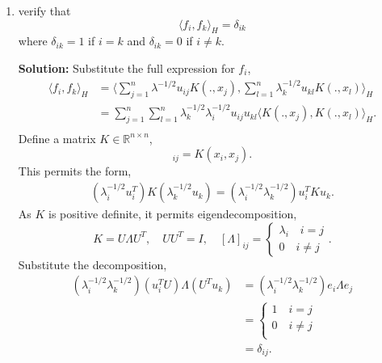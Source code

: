 \documentclass{article}[12pt]
\begin{document}
\begin{enumerate}
\item verify that 
\begin{equation}
\langle f_i,f_k \rangle_H=\delta_{ik}
\end{equation}
where $\delta_{ik}=1$ if $i=k$ and $\delta_{ik}=0$ if $i \not = k$. 

\textbf{Solution:} Substitute the full expression for $f_i$,
\begin{equation}
	\begin{aligned}
	\langle f_i, f_k \rangle_{H} &= \langle \sum^{n}_{j=1} \lambda^{-1/2} u_{ij} K(., x_j), \sum^{n}_{l=1} \lambda^{-1/2}_k u_{kl} K(., x_l)   \rangle_H \\
				     &= \sum^{n}_{j=1} \sum^{n}_{l=1} \lambda_k^{-1/2} \lambda_i^{-1/2} u_{ij} u_{kl} \langle K(., x_j), K(., x_l) \rangle_H. \\  
	\end{aligned}
\end{equation}
Define a matrix $K \in \mathbb R^{n \times n}$,
\begin{equation}
	[K]_{ij} = K(x_i, x_j).
\end{equation}
This permits the form,
\begin{equation}
	\begin{aligned}
		\left( \lambda_i^{-1/2} u_i^T \right) K \left( \lambda_k^{-1/2} u_k \right) = \left( \lambda_i^{-1/2} \lambda_k^{-1/2} \right) u_i^T K u_k.
	\end{aligned}
\end{equation}
As $K$ is positive definite, it permits eigendecomposition, 
\begin{equation}
	K =  U\Lambda U^T,\quad UU^T = I, \quad [\Lambda]_{ij} = \begin{cases} \lambda_i \quad i = j \\ 0 \quad i \ne j \end{cases}.
\end{equation}
Substitute the decomposition,
\begin{equation}
	\begin{aligned}
		\left( \lambda_i^{-1/2} \lambda_k^{-1/2} \right) \left(u_i^T U \right) \Lambda \left( U^T u_k \right) &=  \left( \lambda_i^{-1/2} \lambda_k^{-1/2} \right) e_i \Lambda e_j \\
	&= \begin{cases}
		1 \quad i = j \\
		0 \quad i \ne j \\
	\end{cases}\\
	&= \delta_{ij}.
	\end{aligned}
\end{equation}






\end{enumerate}
\end{document}
